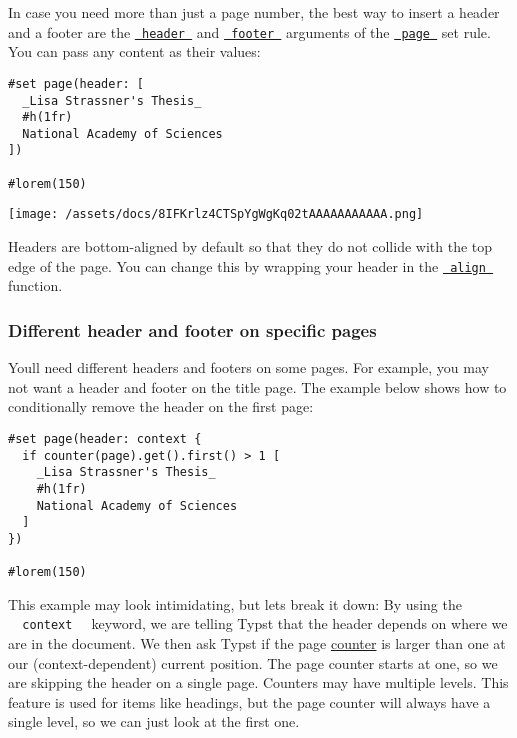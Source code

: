 In case you need more than just a page number, the best way to insert a
header and a footer are the
\href{/docs/reference/layout/page/\#parameters-header}{\texttt{\ header\ }}
and
\href{/docs/reference/layout/page/\#parameters-footer}{\texttt{\ footer\ }}
arguments of the \href{/docs/reference/layout/page/}{\texttt{\ page\ }}
set rule. You can pass any content as their values:

\begin{verbatim}
#set page(header: [
  _Lisa Strassner's Thesis_
  #h(1fr)
  National Academy of Sciences
])

#lorem(150)
\end{verbatim}

\texttt{[image: /assets/docs/8IFKrlz4CTSpYgWgKq02tAAAAAAAAAAA.png]}

Headers are bottom-aligned by default so that they do not collide with
the top edge of the page. You can change this by wrapping your header in
the \href{/docs/reference/layout/align/}{\texttt{\ align\ }} function.

\subsubsection{Different header and footer on specific
pages}\label{specific-pages}

You\textquotesingle ll need different headers and footers on some pages.
For example, you may not want a header and footer on the title page. The
example below shows how to conditionally remove the header on the first
page:

\begin{verbatim}
#set page(header: context {
  if counter(page).get().first() > 1 [
    _Lisa Strassner's Thesis_
    #h(1fr)
    National Academy of Sciences
  ]
})

#lorem(150)
\end{verbatim}

This example may look intimidating, but let\textquotesingle s break it
down: By using the \texttt{\ }{\texttt{\ context\ }}\texttt{\ } keyword,
we are telling Typst that the header depends on where we are in the
document. We then ask Typst if the page
\href{/docs/reference/introspection/counter/}{counter} is larger than
one at our (context-dependent) current position. The page counter starts
at one, so we are skipping the header on a single page. Counters may
have multiple levels. This feature is used for items like headings, but
the page counter will always have a single level, so we can just look at
the first one.

